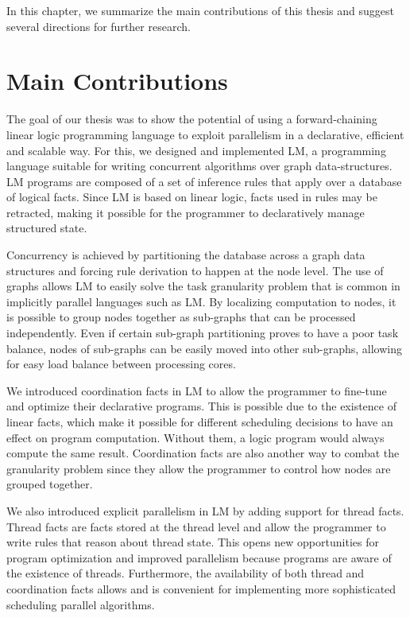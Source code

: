 
In this chapter, we summarize the main contributions of this thesis and suggest
several directions for further research.

\section{Main Contributions}

The goal of our thesis was to show the potential of using a forward-chaining
linear logic programming language to exploit parallelism in a declarative,
efficient and scalable way. For this, we designed and implemented LM, a
programming language suitable for writing concurrent algorithms over graph
data-structures. LM programs are composed of a set of inference rules that apply
over a database of logical facts.  Since LM is based on linear logic, facts used
in rules may be retracted, making it possible for the programmer to
declaratively manage structured state.

Concurrency is achieved by partitioning the database across a graph data
structures and forcing rule derivation to happen at the node level. The use of
graphs allows LM to easily solve the task granularity problem that is common in
implicitly parallel languages such as LM. By localizing computation to nodes, it
is possible to group nodes together as sub-graphs that can be processed
independently. Even if certain sub-graph partitioning proves to have a poor task
balance, nodes of sub-graphs can be easily moved into other sub-graphs,
allowing for easy load balance between processing cores.

We introduced coordination facts in LM to allow the programmer to fine-tune and
optimize their declarative programs. This is possible due to the existence of
linear facts, which make it possible for different scheduling decisions to have
an effect on program computation. Without them, a logic program would always
compute the same result. Coordination facts are also another way to combat the
granularity problem since they allow the programmer to control how nodes are
grouped together.

We also introduced explicit parallelism in LM by adding support for thread
facts. Thread facts are facts stored at the thread level and allow the
programmer to write rules that reason about thread state. This opens new
opportunities for program optimization and improved parallelism because programs
are aware of the existence of threads. Furthermore, the availability of both
thread and coordination facts allows and is convenient for implementing more
sophisticated scheduling parallel algorithms.

